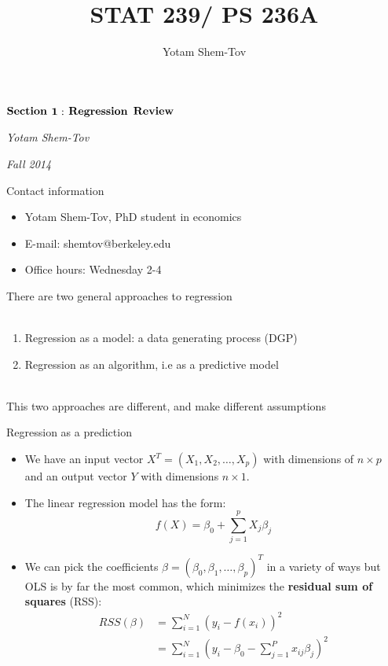 \documentclass[handout]{beamer}
\author{Yotam Shem-Tov}
\title{STAT 239/ PS 236A}
\begin{document}


\begin{frame}{}

\centering

\LARGE

$\bold{Section}$ $\bold{1:}$ $\bold{Regression}$ $\bold{Review}$

\vspace{0.4 in}

\large
\textit{Yotam Shem-Tov}

\vspace{0.1 in}

\textit{Fall 2014}

\end{frame}


\begin{frame}{Contact information}
\begin{itemize}

\item Yotam Shem-Tov, PhD student in economics
\item E-mail: shemtov@berkeley.edu
\item Office hours: Wednesday 2-4
\end{itemize}
\end{frame}


\begin{frame}{}
There are two general approaches to regression \\~\\
\begin{enumerate}
\item Regression as a model: a data generating process (DGP)
\item Regression as an algorithm, i.e as a predictive model \\~\
\end{enumerate}
This two approaches are different, and make different assumptions
\end{frame}

\begin{frame}{Regression as a prediction}
	\begin{itemize}
		\item<+-> We have an input vector $X^T = (X_1, X_2, \dots, X_p)$ with dimensions of  $n \times p$ and an output vector $Y$ with dimensions $n \times 1$. 
		\item<+-> The linear regression model has the form:
		$$ f(X) = \beta_0 + \sum_{j=1}^p X_j \beta_j $$
		\item<+-> We can pick the coefficients $\beta = (\beta_0,\beta_1,\dots,\beta_p)^T$ in a variety of ways but OLS is by far the most common, which minimizes the \textbf{residual sum of squares} (RSS):
		  \begin{align*}
			RSS(\beta) &= \sum_{i=1}^N (y_i - f(x_i))^2 \\
					   &= \sum_{i=1}^N (y_i - \beta_0 - \sum_{j=1}^P x_{ij}\beta_j)^2
			\end{align*}
	\end{itemize}
\end{frame}
	
\end{document}
